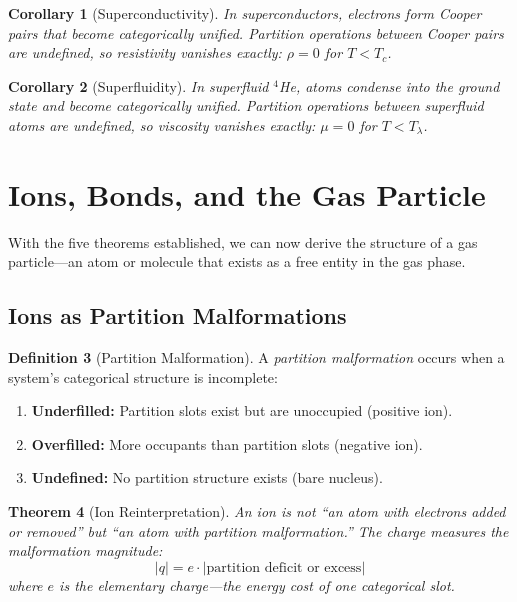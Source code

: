 \documentclass[twocolumn,10pt,a4paper]{article}
\theoremstyle{plain}
\newtheorem{theorem}{Theorem}[section]
\newtheorem{corollary}[theorem]{Corollary}
\theoremstyle{definition}
\newtheorem{definition}[theorem]{Definition}
\theoremstyle{remark}
\begin{document}
\begin{corollary}[Superconductivity]
\label{cor:superconductivity}
In superconductors, electrons form Cooper pairs that become categorically unified. Partition operations between Cooper pairs are undefined, so resistivity vanishes exactly: $\rho = 0$ for $T < T_c$.
\end{corollary}

\begin{corollary}[Superfluidity]
\label{cor:superfluidity}
In superfluid $^4$He, atoms condense into the ground state and become categorically unified. Partition operations between superfluid atoms are undefined, so viscosity vanishes exactly: $\mu = 0$ for $T < T_\lambda$.
\end{corollary}

\section{Ions, Bonds, and the Gas Particle}
\label{sec:bonds}

With the five theorems established, we can now derive the structure of a gas particle---an atom or molecule that exists as a free entity in the gas phase.

\subsection{Ions as Partition Malformations}

\begin{definition}[Partition Malformation]
\label{def:malformation}
A \emph{partition malformation} occurs when a system's categorical structure is incomplete:
\begin{enumerate}
    \item \textbf{Underfilled:} Partition slots exist but are unoccupied (positive ion).
    \item \textbf{Overfilled:} More occupants than partition slots (negative ion).
    \item \textbf{Undefined:} No partition structure exists (bare nucleus).
\end{enumerate}
\end{definition}

\begin{theorem}[Ion Reinterpretation]
\label{thm:ion}
An ion is not ``an atom with electrons added or removed'' but ``an atom with partition malformation.'' The charge measures the malformation magnitude:
\begin{equation}
    |q| = e \cdot |\text{partition deficit or excess}|
\end{equation}
where $e$ is the elementary charge---the energy cost of one categorical slot.
\end{theorem}
\end{document}
